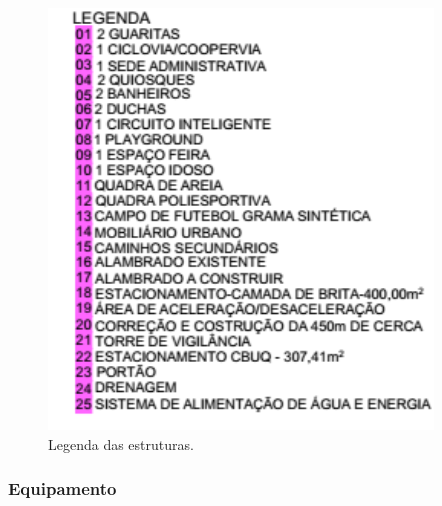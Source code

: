 \begin{figure}[H]
	 \centering
	\label{Legenda das estruturas}
	 \includegraphics[keepaspectratio=true,scale=0.8]{monitoramento/6.png}
	 \caption{Legenda das estruturas.}
\end{figure}

\subsubsection{Equipamento}

